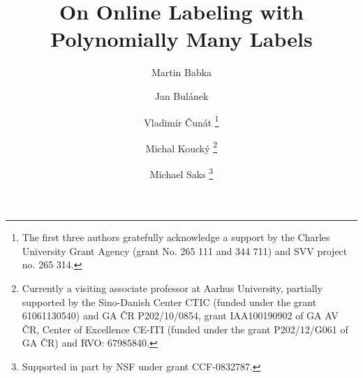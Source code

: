 \documentclass[runningheads,a4paper]{llncs}
\begin{document}
\mainmatter  %

\title{On Online Labeling with Polynomially Many Labels}

%
%
\author{Martin Babka%
\and Jan Bul\'anek%
\and Vladim\'ir \v{C}un\'at
\thanks{The first three authors gratefully acknowledge a support by the Charles University Grant Agency (grant No. 265 111 and 344 711) and SVV project no. 265 314.}%
\and Michal Kouck\'y
\thanks{Currently a visiting associate professor at Aarhus University, partially supported by the Sino-Danish Center CTIC (funded under the grant 61061130540) and GA \v{C}R P202/10/0854, grant IAA100190902 of GA AV \v{C}R, Center of Excellence CE-ITI (funded under the grant P202/12/G061 of GA \v{C}R) and RVO: 67985840.}
\and Michael Saks
\thanks{Supported in part by NSF under  grant CCF-0832787.}
}


%


%
%
\end{document}
